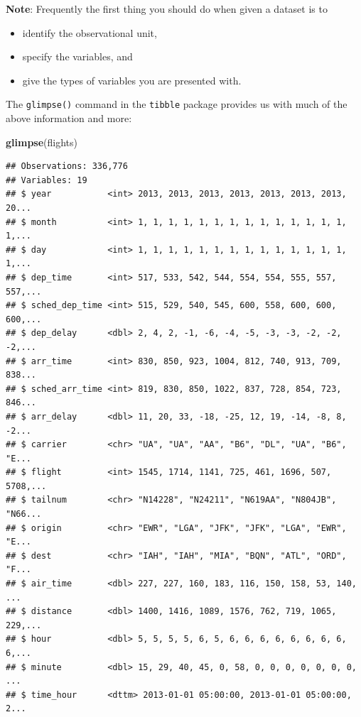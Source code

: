\documentclass[]{tufte-book}
\newenvironment{Shaded}{\begin{snugshade}}{\end{snugshade}}
\newcommand{\KeywordTok}[1]{\textcolor[rgb]{0.13,0.29,0.53}{\textbf{{#1}}}}
\newcommand{\NormalTok}[1]{{#1}}
\providecommand{\tightlist}{%
  \setlength{\itemsep}{0pt}\setlength{\parskip}{0pt}}
\begin{document}
\textbf{Note}: Frequently the first thing you should do when given a
dataset is to

\begin{itemize}
\tightlist
\item
  identify the observational unit,
\item
  specify the variables, and
\item
  give the types of variables you are presented with.
\end{itemize}

The \texttt{glimpse()} command in the \texttt{tibble} package provides
us with much of the above information and more:

\begin{Shaded}
\begin{Highlighting}[]
\KeywordTok{glimpse}\NormalTok{(flights)}
\end{Highlighting}
\end{Shaded}

\begin{verbatim}
## Observations: 336,776
## Variables: 19
## $ year           <int> 2013, 2013, 2013, 2013, 2013, 2013, 2013, 20...
## $ month          <int> 1, 1, 1, 1, 1, 1, 1, 1, 1, 1, 1, 1, 1, 1, 1,...
## $ day            <int> 1, 1, 1, 1, 1, 1, 1, 1, 1, 1, 1, 1, 1, 1, 1,...
## $ dep_time       <int> 517, 533, 542, 544, 554, 554, 555, 557, 557,...
## $ sched_dep_time <int> 515, 529, 540, 545, 600, 558, 600, 600, 600,...
## $ dep_delay      <dbl> 2, 4, 2, -1, -6, -4, -5, -3, -3, -2, -2, -2,...
## $ arr_time       <int> 830, 850, 923, 1004, 812, 740, 913, 709, 838...
## $ sched_arr_time <int> 819, 830, 850, 1022, 837, 728, 854, 723, 846...
## $ arr_delay      <dbl> 11, 20, 33, -18, -25, 12, 19, -14, -8, 8, -2...
## $ carrier        <chr> "UA", "UA", "AA", "B6", "DL", "UA", "B6", "E...
## $ flight         <int> 1545, 1714, 1141, 725, 461, 1696, 507, 5708,...
## $ tailnum        <chr> "N14228", "N24211", "N619AA", "N804JB", "N66...
## $ origin         <chr> "EWR", "LGA", "JFK", "JFK", "LGA", "EWR", "E...
## $ dest           <chr> "IAH", "IAH", "MIA", "BQN", "ATL", "ORD", "F...
## $ air_time       <dbl> 227, 227, 160, 183, 116, 150, 158, 53, 140, ...
## $ distance       <dbl> 1400, 1416, 1089, 1576, 762, 719, 1065, 229,...
## $ hour           <dbl> 5, 5, 5, 5, 6, 5, 6, 6, 6, 6, 6, 6, 6, 6, 6,...
## $ minute         <dbl> 15, 29, 40, 45, 0, 58, 0, 0, 0, 0, 0, 0, 0, ...
## $ time_hour      <dttm> 2013-01-01 05:00:00, 2013-01-01 05:00:00, 2...
\end{verbatim}
\end{document}
